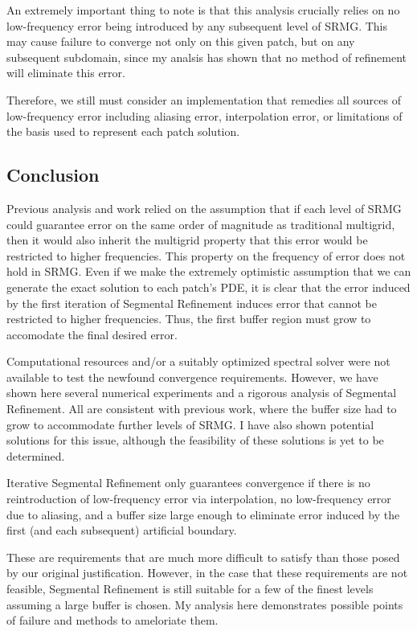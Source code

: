 \documentclass[final]{siamart1116}
\numberwithin{theorem}{section}
\begin{document}
An extremely important thing to note is that this analysis crucially relies on no low-frequency error being introduced by any subsequent level of SRMG. This may cause failure to converge not only on this given patch, but on any subsequent subdomain, since my analsis has shown that no method of refinement will eliminate this error. 

Therefore, we still must consider an implementation that remedies all sources of low-frequency error including aliasing error, interpolation error, or limitations of the basis used to represent each patch solution.


\subsection{Conclusion}\label{sec:conc}

Previous analysis and work relied on the assumption that if each level of SRMG could guarantee error on the same order of magnitude as traditional multigrid, then it would also inherit the multigrid property that this error would be restricted to higher frequencies. This property on the frequency of error does not hold in SRMG. Even if we make the extremely optimistic assumption that we can generate the exact solution to each patch's PDE, it is clear that the error induced by the first iteration of Segmental Refinement induces error that cannot be restricted to higher frequencies. Thus, the first buffer region must grow to accomodate the final desired error. 

Computational resources and/or a suitably optimized spectral solver were not available to test the newfound convergence requirements. However, we have shown here several numerical experiments and a rigorous analysis of Segmental Refinement. All are consistent with previous work, where the buffer size had to grow to accommodate further levels of SRMG. I have also shown potential solutions for this issue, although the feasibility of these solutions is yet to be determined. 

Iterative Segmental Refinement only guarantees convergence if there is no reintroduction of low-frequency error via interpolation, no low-frequency error due to aliasing, and a buffer size large enough to eliminate error induced by the first (and each subsequent) artificial boundary.  

These are requirements that are much more difficult to satisfy than those posed by our original justification. However, in the case that these requirements are not feasible, Segmental Refinement is still suitable for a few of the finest levels assuming a large buffer is chosen. My analysis here demonstrates possible points of failure and methods to ameloriate them. 





\end{document}

